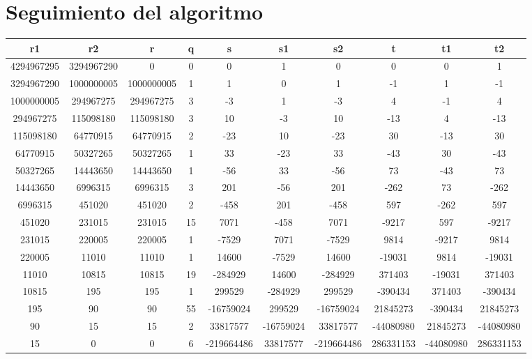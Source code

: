 \section{Seguimiento del algoritmo}
\begin{center}
\begin{sideways}
\begin{tabular}{|c|c|c|c|c|c|c|c|c|c|}
\hline
r1&r2&r&q&s&s1&s2&t&t1&t2\\\hline
4294967295&3294967290&0&0&0&1&0&0&0&1\\\hline
3294967290&1000000005&1000000005&1&1&0&1&-1&1&-1\\\hline
1000000005&294967275&294967275&3&-3&1&-3&4&-1&4\\\hline
294967275&115098180&115098180&3&10&-3&10&-13&4&-13\\\hline
115098180&64770915&64770915&2&-23&10&-23&30&-13&30\\\hline
64770915&50327265&50327265&1&33&-23&33&-43&30&-43\\\hline
50327265&14443650&14443650&1&-56&33&-56&73&-43&73\\\hline
14443650&6996315&6996315&3&201&-56&201&-262&73&-262\\\hline
6996315&451020&451020&2&-458&201&-458&597&-262&597\\\hline
451020&231015&231015&15&7071&-458&7071&-9217&597&-9217\\\hline
231015&220005&220005&1&-7529&7071&-7529&9814&-9217&9814\\\hline
220005&11010&11010&1&14600&-7529&14600&-19031&9814&-19031\\\hline
11010&10815&10815&19&-284929&14600&-284929&371403&-19031&371403\\\hline
10815&195&195&1&299529&-284929&299529&-390434&371403&-390434\\\hline
195&90&90&55&-16759024&299529&-16759024&21845273&-390434&21845273\\\hline
90&15&15&2&33817577&-16759024&33817577&-44080980&21845273&-44080980\\\hline
15&0&0&6&-219664486&33817577&-219664486&286331153&-44080980&286331153\\\hline
\end{tabular}
\end{sideways}
\end{center}





